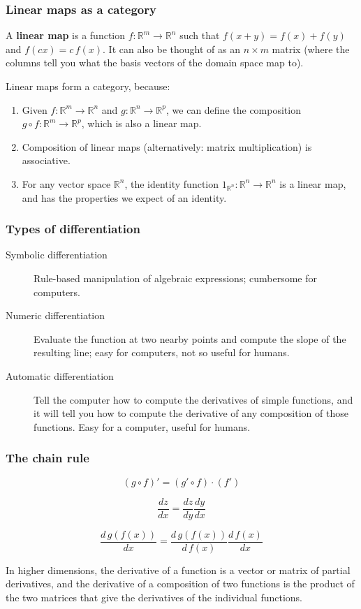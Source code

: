 \documentclass[10pt]{beamer}
\theoremstyle{definition}
\theoremstyle{remark}
\numberwithin{equation}{section}
\begin{document}
\begin{frame}[fragile]{}
  \frametitle{Linear maps as a category}

  A \textbf{linear map} is a function $f\colon \mathbb{R}^m \rightarrow \mathbb{R}^n$
  such that $f(x + y) = f(x) + f(y)$ and $f(cx) = c\,f(x)$.
  It can also be thought of as an $n \times m$ matrix (where the columns tell you
  what the basis vectors of the domain space map to).

  Linear maps form a category, because:
  \begin{enumerate}
  \item Given $f\colon \mathbb{R}^m \rightarrow \mathbb{R}^n$ and $g\colon \mathbb{R}^n \rightarrow
    \mathbb{R}^p$, we can define the composition $g \circ f \colon \mathbb{R}^m \rightarrow
    \mathbb{R}^p$, which is also a linear map.
  \item Composition of linear maps (alternatively: matrix multiplication) is
    associative.
  \item For any vector space $\mathbb{R}^n$, the identity function
    $1_{\mathbb{R}^n}\colon \mathbb{R}^n \rightarrow \mathbb{R}^n$ is a linear map, and
    has the properties we expect of an identity.
  \end{enumerate}
\end{frame}

\begin{frame}[fragile]
  \frametitle{Types of differentiation}

  \begin{description}
  \item[Symbolic differentiation] Rule-based manipulation of algebraic
    expressions; cumbersome for computers.
  \item[Numeric differentiation] Evaluate the function at two nearby points and
    compute the slope of the resulting line; easy for computers, not so useful
    for humans.
  \item[Automatic differentiation] Tell the computer how to compute the
    derivatives of simple functions, and it will tell you how to compute the
    derivative of any composition of those functions. Easy for a computer,
    useful for humans.
  \end{description}
\end{frame}

\begin{frame}[fragile]
  \frametitle{The chain rule}

  \[(g \circ f)' = (g' \circ f) \cdot (f')\]

  \[\frac{dz}{dx} = \frac{dz}{dy} \frac{dy}{dx}\]

  \[\frac{d\,g(f(x))}{dx} = \frac{d\,g(f(x))}{d\,f(x)} \frac{d\,f(x)}{dx}\]

  In higher dimensions, the derivative of a function is a vector or matrix of
  partial derivatives,
  and the derivative of a composition of two functions is the product of the two
  matrices that give the derivatives of the individual functions.

\end{frame}
\end{document}
